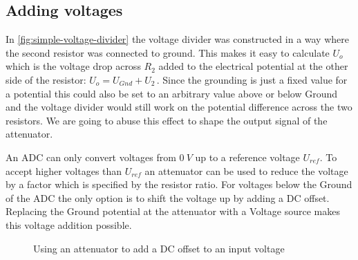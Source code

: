 \subsection{Adding voltages}

In \cref{fig:simple-voltage-divider} the voltage divider was constructed in a way where the second resistor was connected to ground. This makes it easy to calculate $U_o$ which is the voltage drop across $R_2$ added to the electrical potential at the other side of the resistor: $U_o = U_{Gnd} + U_2\,$. Since the grounding is just a fixed value for a potential this could also be set to an arbitrary value above or below Ground and the voltage divider would still work on the potential difference across the two resistors. We are going to abuse this effect to shape the output signal of the attenuator.

An ADC can only convert voltages from $\SI{0}{V}$ up to a reference voltage $U_{ref}$. To accept higher voltages than $U_{ref}$ an attenuator can be used to reduce the voltage by a factor which is specified by the resistor ratio. For voltages below the Ground of the ADC the only option is to shift the voltage up by adding a DC offset. Replacing the Ground potential at the attenuator with a Voltage source makes this voltage addition possible.

\begin{figure}[htb]
	\centering
	\caption{Using an attenuator to add a DC offset to an input voltage}
	\label{fig:attenuator-voltage-adder}
\end{figure}

